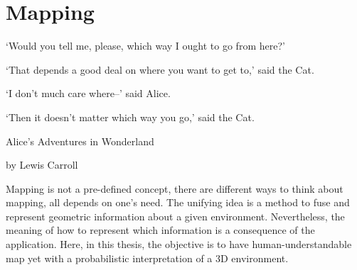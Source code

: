 
\chapter{Mapping}

\renewcommand{\epigraphsize}{\footnotesize}
\epigraph{`Would you tell me, please, which way I ought to go from here?'

  `That depends a good deal on where you want to get to,' said the Cat.

  `I don't much care where--' said Alice.

  `Then it doesn't matter which way you go,' said the Cat. }{Alice's Adventures
  in Wonderland

  by Lewis Carroll}
  
Mapping is not a pre-defined concept, there are different ways to think about
mapping, all depends on one's need. The unifying idea is a method to fuse and
represent geometric information about a given environment. Nevertheless, the
meaning of how to represent which information is a consequence of the
application. Here, in this thesis, the objective is to have human-understandable
map yet with a probabilistic interpretation of a 3D environment. 







